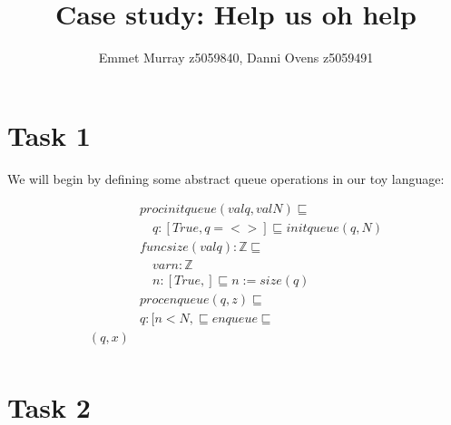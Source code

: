 \documentclass[a4paper]{scrartcl}
\title{Case study: Help us oh help}
\author{Emmet Murray z5059840, Danni Ovens z5059491}
\newcommand{\Z}{\mathbb{Z}}
\newcommand{\refinedby}{\sqsubseteq} %
\begin{document}
\maketitle
\section*{Task 1}
We will begin by defining some abstract queue operations in our toy language:

\begin{align*}
& proc initqueue(val q, val N) \refinedby \\
    & \quad q : [True, q = <> ] \refinedby initqueue(q, N) \\
& func size(val q) : \Z \refinedby \\
    & \quad var n : \Z \\
    & \quad n : [True, ] \refinedby n := size(q) \\
& proc enqueue(q, z) \refinedby \\
    & q : [n < N,  \refinedby enqueue \refinedby \\(q, x) \\
\end{align*}

\section*{Task 2}
\end{document}
